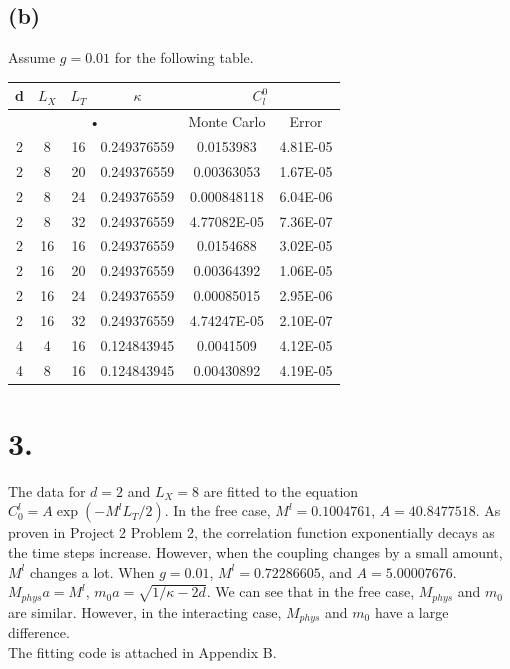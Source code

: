 \documentclass[12pt]{article}
\begin{document}
\subsection*{(b)}
Assume $g = 0.01$ for the following table. \\
\begin{center}
\begin{tabular}{|c|c|c|c|c|c|}
\hline 
d & $L_X$ & $L_T$ & $\kappa$ & \multicolumn{2}{c|}{$C_l^0$} \\ 
\hline 
\multicolumn{4}{|c|}{•} & Monte Carlo & Error\\ 
\hline 
2 & 8 & 16 & 0.249376559 & 0.0153983 & 4.81E-05\\ 
\hline 
2 & 8 & 20 & 0.249376559 & 0.00363053 & 1.67E-05\\ 
\hline 
2 & 8 & 24 & 0.249376559 & 0.000848118 & 6.04E-06\\ 
\hline 
2 & 8 & 32 & 0.249376559 & 4.77082E-05 & 7.36E-07\\ 
\hline 
2 & 16 & 16 & 0.249376559 & 0.0154688 & 3.02E-05\\ 
\hline 
2 & 16 & 20 & 0.249376559 & 0.00364392 & 1.06E-05\\ 
\hline 
2 & 16 & 24 & 0.249376559 & 0.00085015 & 2.95E-06\\ 
\hline 
2 & 16 & 32 & 0.249376559 & 4.74247E-05 & 2.10E-07\\ 
\hline 
4 & 4 & 16 & 0.124843945 & 0.0041509 & 4.12E-05\\ 
\hline 
4 & 8 & 16 & 0.124843945 & 0.00430892 & 4.19E-05\\ 
\hline 
\end{tabular} 
\end{center}

\section*{3.}
The data for $d = 2$ and $L_X = 8$ are fitted to the equation $C_0^l = A\exp(-M^l L_T/2)$. In the free case, $M^l = 0.1004761$, $A = 40.8477518$. As proven in Project 2 Problem 2, the correlation function exponentially decays as the time steps increase. However, when the coupling changes by a small amount, $M^l$ changes a lot. When $g = 0.01$, $M^l = 0.72286605$, and $A = 5.00007676$. $M_{phys}a = M^l$, $m_0a = \sqrt{1/\kappa-2d}$. We can see that in the free case, $M_{phys}$ and $m_0$ are similar. However, in the interacting case, $M_{phys}$ and $m_0$ have a large difference. \\
The fitting code is attached in Appendix B. \\
\end{document}
